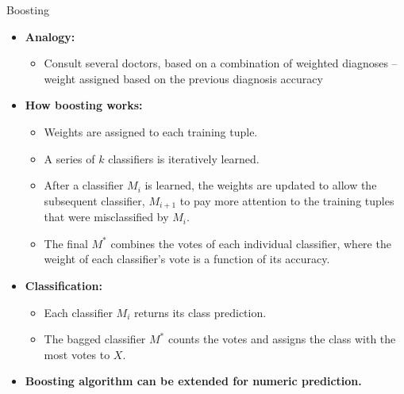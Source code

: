 \begin{frame}{Boosting}
	\begin{itemize}
		\item \textbf{Analogy:}
		      \begin{itemize}
			      \item Consult several doctors, based on a combination of weighted diagnoses -- weight assigned based on the previous diagnosis accuracy
		      \end{itemize}
		\item \textbf{How boosting works:}
		      \begin{itemize}
			      \item Weights are assigned to each training tuple.
			      \item A series of $k$ classifiers is iteratively learned.
			      \item After a classifier $M_i$ is learned, the weights are updated to allow the subsequent classifier, $M_{i+1}$ to pay more attention to the training tuples that were misclassified by $M_i$.
			      \item The final $M^*$ combines the votes of each individual classifier, where the weight of each classifier's vote is a function of its accuracy.
		      \end{itemize}
		\item \textbf{Classification:}
		      \begin{itemize}
			      \item Each classifier $M_i$ returns its class prediction.
			      \item The bagged classifier $M^*$ counts the votes and assigns the class with the most votes to $X$.
		      \end{itemize}
		\item \textbf{Boosting algorithm can be extended for numeric prediction.}
	\end{itemize}
\end{frame}


